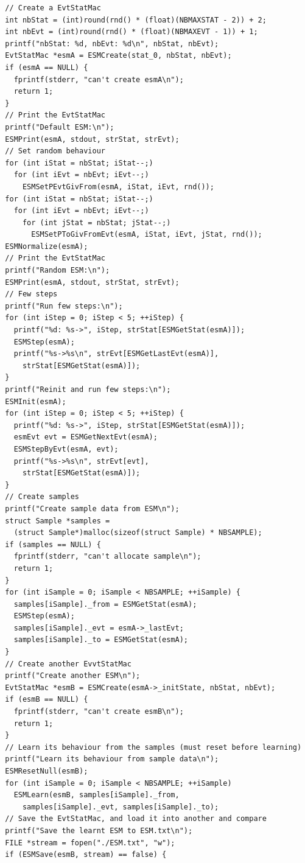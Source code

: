 \documentclass[12pt, a4paper]{article}
\begin{document}
\begin{scriptsize}
\begin{ttfamily}
\begin{lstlisting}
  // Create a EvtStatMac
  int nbStat = (int)round(rnd() * (float)(NBMAXSTAT - 2)) + 2;
  int nbEvt = (int)round(rnd() * (float)(NBMAXEVT - 1)) + 1;
  printf("nbStat: %d, nbEvt: %d\n", nbStat, nbEvt);
  EvtStatMac *esmA = ESMCreate(stat_0, nbStat, nbEvt); 
  if (esmA == NULL) {
    fprintf(stderr, "can't create esmA\n");
    return 1;
  }
  // Print the EvtStatMac
  printf("Default ESM:\n");
  ESMPrint(esmA, stdout, strStat, strEvt);
  // Set random behaviour
  for (int iStat = nbStat; iStat--;)
    for (int iEvt = nbEvt; iEvt--;)
      ESMSetPEvtGivFrom(esmA, iStat, iEvt, rnd());
  for (int iStat = nbStat; iStat--;)
    for (int iEvt = nbEvt; iEvt--;)
      for (int jStat = nbStat; jStat--;)
        ESMSetPToGivFromEvt(esmA, iStat, iEvt, jStat, rnd());
  ESMNormalize(esmA);
  // Print the EvtStatMac
  printf("Random ESM:\n");
  ESMPrint(esmA, stdout, strStat, strEvt);
  // Few steps
  printf("Run few steps:\n");
  for (int iStep = 0; iStep < 5; ++iStep) {
    printf("%d: %s->", iStep, strStat[ESMGetStat(esmA)]);
    ESMStep(esmA);
    printf("%s->%s\n", strEvt[ESMGetLastEvt(esmA)], 
      strStat[ESMGetStat(esmA)]);
  }
  printf("Reinit and run few steps:\n");
  ESMInit(esmA);
  for (int iStep = 0; iStep < 5; ++iStep) {
    printf("%d: %s->", iStep, strStat[ESMGetStat(esmA)]);
    esmEvt evt = ESMGetNextEvt(esmA);
    ESMStepByEvt(esmA, evt);
    printf("%s->%s\n", strEvt[evt], 
      strStat[ESMGetStat(esmA)]);
  }
  // Create samples
  printf("Create sample data from ESM\n");
  struct Sample *samples = 
    (struct Sample*)malloc(sizeof(struct Sample) * NBSAMPLE);
  if (samples == NULL) {
    fprintf(stderr, "can't allocate sample\n");
    return 1;
  }
  for (int iSample = 0; iSample < NBSAMPLE; ++iSample) {
    samples[iSample]._from = ESMGetStat(esmA);
    ESMStep(esmA);
    samples[iSample]._evt = esmA->_lastEvt;
    samples[iSample]._to = ESMGetStat(esmA);
  }
  // Create another EvvtStatMac
  printf("Create another ESM\n");
  EvtStatMac *esmB = ESMCreate(esmA->_initState, nbStat, nbEvt); 
  if (esmB == NULL) {
    fprintf(stderr, "can't create esmB\n");
    return 1;
  }
  // Learn its behaviour from the samples (must reset before learning)
  printf("Learn its behaviour from sample data\n");
  ESMResetNull(esmB);
  for (int iSample = 0; iSample < NBSAMPLE; ++iSample)
    ESMLearn(esmB, samples[iSample]._from, 
      samples[iSample]._evt, samples[iSample]._to);
  // Save the EvtStatMac, and load it into another and compare
  printf("Save the learnt ESM to ESM.txt\n");
  FILE *stream = fopen("./ESM.txt", "w");
  if (ESMSave(esmB, stream) == false) {

\end{lstlisting}
\end{ttfamily}
\end{scriptsize}
\end{document}
